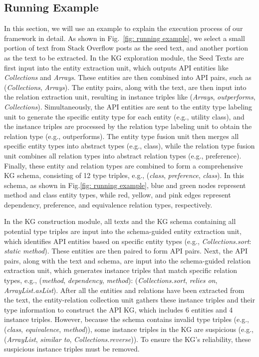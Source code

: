 \subsection{Running Example}
In this section, we will use an example to explain the execution process of our framework in detail.
As shown in Fig.~\ref{fig: running example}, we select a small portion of text from Stack Overflow posts as the seed text, and another portion as the text to be extracted.
In the KG exploration module, the Seed Texts are first input into the entity extraction unit, which outputs API entities like \textit{Collections} and \textit{Arrays}.
These entities are then combined into API pairs, such as (\textit{Collections}, \textit{Arrays}).
The entity pairs, along with the text, are then input into the relation extraction unit, resulting in instance triples like (\textit{Arrays}, \textit{outperforms}, \textit{Collections}).
Simultaneously, the API entities are sent to the entity type labeling unit to generate the specific entity type for each entity (e.g., utility class), and the instance triples are processed by the relation type labeling unit to obtain the relation type (e.g., outperforms).
The entity type fusion unit then merges all specific entity types into abstract types (e.g., class), while the relation type fusion unit combines all relation types into abstract relation types (e.g., preference). Finally, these entity and relation types are combined to form a comprehensive KG schema, consisting of 12 type triples, e.g., (\textit{class}, \textit{preference}, \textit{class}).
In this schema, as shown in Fig.\ref{fig: running example}, blue and green nodes represent method and class entity types, while red, yellow, and pink edges represent dependency, preference, and equivalence relation types, respectively.

In the KG construction module, all texts and the KG schema containing all potential type triples are input into the schema-guided entity extraction unit, which identifies API entities based on specific entity types (e.g., \textit{Collections.sort}: \textit{static method}).
These entities are then paired to form API pairs.
Next, the API pairs, along with the text and schema, are input into the schema-guided relation extraction unit, which generates instance triples that match specific relation types, e.g., (\textit{method}, \textit{dependency}, \textit{method}): (\textit{Collections.sort}, \textit{relies on}, \textit{ArrayList.asList}).
After all the entities and relations have been extracted from the text, the entity-relation collection unit gathers these instance triples and their type information to construct the API KG, which includes 6 entities and 4 instance triples.
However, because the schema contains invalid type triples (e.g., (\textit{class}, \textit{equivalence}, \textit{method})), some instance triples in the KG are suspicious (e.g., (\textit{ArrayList}, \textit{similar to}, \textit{Collections.reverse})).
To ensure the KG's reliability, these suspicious instance triples must be removed.

